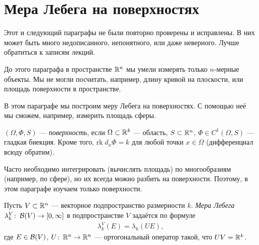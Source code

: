 
\section{Мера Лебега на поверхностях}

{\color{red} Этот и следующий параграфы не были повторно проверены и исправлены. В них может быть много недописанного, непонятного, или даже неверного. Лучше обратиться к записям лекций.}

До этого параграфа в пространстве $\mathbb{R}^{n}$ мы умели измерять только $n$-мерные объекты. Мы не могли посчитать, например, длину кривой на плоскости, или площадь поверхности в пространстве.

В этом параграфе мы построим меру Лебега на поверхностях. С помощью неё мы сможем, например, измерить площадь сферы.

\begin{df}
 \label{definition:surface}
 $(\Omega, \Phi, S)$ --- \textit{поверхность}, если $\Omega \subset \mathbb{R}^{k}$ --- область, $S \subset \mathbb{R}^{n}$, $\Phi \in C^{1}(\Omega, S)$ --- гладкая биекция. Кроме того, $\mathrm{rk}\; d_{x} \Phi = k$ для любой точки $x \in \Omega$ (дифференциал всюду обратим).
\end{df}
\begin{remrk*}
 Часто необходимо интегрировать (вычислять площадь) по многообразиям (например, по сфере), но их всегда можно разбить на поверхности. Поэтому, в этом параграфе изучаем только поверхности.
\end{remrk*}

\begin{df}
 Пусть $V \subset \mathbb{R}^{n}$ --- векторное подпространство размерности $k$. \textit{Мера Лебега} $\lambda_k^{V} \colon\, \mathcal{B}(V) \to [0, \infty]$ в подпространстве $V$ задаётся по формуле
 \begin{align*}
  \lambda_k^{V}(E) = \lambda_k(UE)
 ,\end{align*} где $E \in \mathcal{B}(V)$, $U \colon\, \mathbb{R}^{n} \to \mathbb{R}^{n}$ --- ортогональный оператор такой, что $UV = \mathbb{R}^{k}$.
\end{df}


